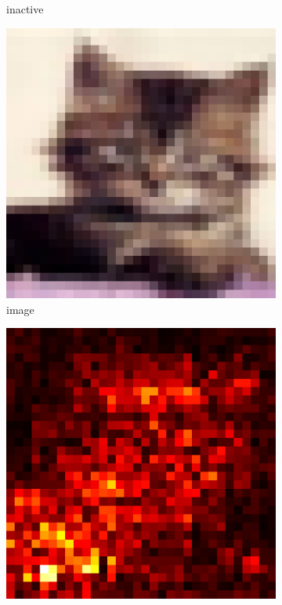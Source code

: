 \documentclass[preprint,12pt]{elsarticle}
\begin{document}
\begin{figure}
\begin{subfigure}{0.14\textwidth}
        \caption{inactive}
    \end{subfigure}
    \hfill
    \begin{subfigure}{0.14\linewidth}
        \centering
        \includegraphics[width=\linewidth]{../visualizations/examples/cifar10/cnn/images/3.png}
        \caption{image}
    \end{subfigure}
    \hfill
    \begin{subfigure}{0.14\linewidth}
        \centering
        \includegraphics[width=\linewidth]{../visualizations/examples/cifar10/cnn/saliency_map/3.png}

\end{subfigure}
\end{figure}
\end{document}
